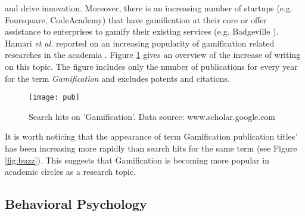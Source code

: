and drive innovation. %
Moreover, there is an increasing number of startups (e.g. Foursquare, CodeAcademy) that have gamification  at  their  core \cite{codeacademy} or offer assistance to enterprises to gamify their existing services (e.g. Badgeville \cite{badgeville}). Hamari \textit{et al.} reported on an increasing popularity of gamification related researches in the academia \cite{hamari2014does}. Figure \ref{fig:pub} gives an overview of the increase of writing on this topic. The figure includes only the number of publications for every year for the term \textit{Gamification} and excludes patents and citations. 
\begin{figure}[h]
    \centering
    \texttt{[image: pub]}
    \caption{Search hits on 'Gamification'. Data source: www.scholar.google.com}
    \label{fig:pub}
\end{figure}
It is worth noticing that the appearance of term Gamification publication titles' has been increasing more rapidly than search hits for the same term (see Figure \ref{fig:buzz}). This suggests that Gamification is becoming more popular in academic circles as a research topic. 
\subsection{Behavioral  Psychology}
